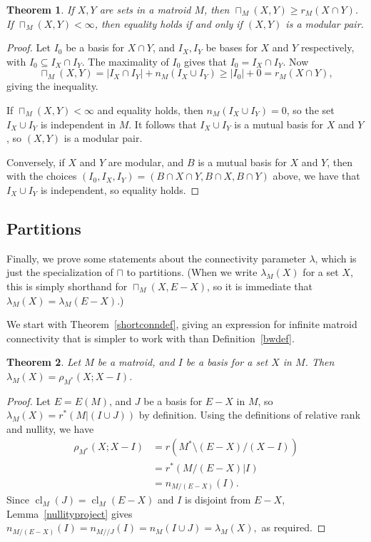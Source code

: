 \documentclass{amsart}
\theoremstyle{plain}
\newtheorem{theorem}{Theorem}[section]
\theoremstyle{definition}
\newcommand{\dcon}{/ \!\! /}
\DeclareMathOperator{\cl}{cl}
\newcommand{\del}{\!\setminus\!}
\newcommand{\con}{/}
\renewcommand{\ge}{\geqslant}
\renewcommand{\ss}{\subseteq}
\newcommand{\relrank}[3]{\rho_{#1}({#2};{#3})}
\begin{document}
\begin{theorem}\label{lcmod}
  If $X, Y$ are sets in a matroid $M$, then $\sqcap_M(X,Y) \ge r_M(X \cap Y)$.
  If $\sqcap_M(X,Y) < \infty$, then equality holds if and only if $(X,Y)$ is a modular pair.
\end{theorem}
\begin{proof}
  Let $I_0$ be a basis for $X \cap Y$, and $I_X, I_Y$ be bases for $X$ and $Y$ respectively, 
  with $I_0 \ss I_X \cap I_Y$. The maximality of $I_0$ gives that $I_0 = I_X \cap I_Y$. 
  Now 
  \[\sqcap_M(X,Y) = |I_X \cap I_Y| + n_M(I_X \cup I_Y) \ge |I_0| + 0 = r_M(X \cap Y),\]
  giving the inequality. 
  
  If $\sqcap_M(X,Y) < \infty$ and equality holds, then $n_M(I_X \cup I_Y) = 0$, 
  so the set $I_X \cup I_Y$ is independent in $M$. 
  It follows that $I_X \cup I_Y$ is a mutual basis for $X$ and $Y$, 
  so $(X,Y)$ is a modular pair. 

  Conversely, if $X$ and $Y$ are modular, and $B$ is a mutual basis for $X$ and $Y$, 
  then with the choices $(I_0,I_X,I_Y) = (B \cap X \cap Y, B \cap X, B \cap Y)$ 
  above, we have that $I_X \cup I_Y$ is independent, so equality holds. 
\end{proof}

\subsection*{Partitions}

Finally, we prove some statements about the connectivity parameter $\lambda$, 
which is just the specialization of $\sqcap$ to partitions. 
(When we write $\lambda_M(X)$ for a set $X$, this is simply shorthand for 
$\sqcap_M(X, E-X)$, so it is immediate that $\lambda_M(X) = \lambda_M(E - X)$.)

We start with Theorem~\ref{shortconndef}, giving an expression for infinite matroid connectivity that is 
simpler to work with than Definition~\ref{bwdef}. 

\begin{theorem}\label{conneqrelrank}
  Let $M$ be a matroid, and $I$ be a basis for a set $X$ in $M$. Then $\lambda_M(X) = \relrank{M^*}{X}{X-I}$. 
\end{theorem}
\begin{proof}
  Let $E = E(M)$, and $J$ be a basis for $E-X$ in $M$, so $\lambda_M(X) = r^*(M | (I \cup J))$ by definition. 
  Using the definitions of relative rank and nullity, we have 
  \begin{align*}
    \relrank{M^*}{X}{X-I} &= r(M^* \del (E-X) \con (X-I)) \\ 
    &= r^*(M \con (E-X) | I) \\
    &= n_{M \con (E-X)}(I).
  \end{align*}
  Since $\cl_M(J) = \cl_M(E-X)$ and $I$ is disjoint from $E-X$, 
  Lemma~\ref{nullityproject} gives $n_{M \con (E-X)}(I) = n_{M \dcon J}(I) = n_M(I \cup J) = \lambda_M(X),$ as required.
\end{proof}
\end{document}
